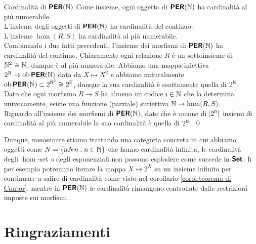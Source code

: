 \documentclass[openany]{book}
\begin{document}
\begin{proposition}{Cardinalità di $\text{\sffamily\textbf{PER}}(\mathbb{N})$}{}
    Come insieme, ogni oggetto di $\text{\sffamily\textbf{PER}}(\mathbb{N})$ ha cardinalità al più numerabile.\\
    L'insieme degli oggetti di $\text{\sffamily\textbf{PER}}(\mathbb{N})$ ha cardinalità del continuo.\\
    L'insieme $\hom(R,S)$ ha cardinalità al più numerabile.\\
    Combinando i due fatti precedenti, l'insieme dei morfismi di $\text{\sffamily\textbf{PER}}(\mathbb{N})$ ha cardinalità del continuo.
    \proof 
    Chiaramente ogni relazione $R$ è un sottoinsieme di $\mathbb{N}^2\cong \mathbb{N}$, dunque è al più numerabile.
    Abbiamo una mappa iniettiva $2^{\mathbb{N}} \to \operatorname{ob}\text{\sffamily\textbf{PER}}(\mathbb{N})$ data da $X\mapsto X^2$ e abbiamo naturalmente $\operatorname{ob}\text{\sffamily\textbf{PER}}(\mathbb{N})\subset 2^{\mathbb{N}^2}\cong 2^{\mathbb{N}}$, dunque la sua cardinalità è esattamente quella di $2^{\mathbb{N}}$.\\
    Dato che ogni morfismo $R\to S$ ha almeno un codice $i \in \mathbb{N}$ che la determina univocamente, esiste una funzione (parziale) suriettiva $\mathbb{N} \to \hom(R,S)$.\\
    Riguardo all'insieme dei morfismi di $\text{\sffamily\textbf{PER}}(\mathbb{N})$, dato che è unione di $|2^{\mathbb{N}}|$ insiemi di cardinalità al più numerabile la sua cardinalità è quella di $2^{\mathbb{N}}$.
    \qed
\end{proposition}

Dunque, nonostante stiamo trattando una categoria concreta in cui abbiamo oggetti come $N = \{nNn : n \in \mathbb{N}\}$ che hanno cardinalità infinita, le cardinalità degli $\hom$-set o degli esponenziali non possono esplodere come succede in $\text{\sffamily\textbf{Set}}$: lì per esempio potremmo iterare la mappa $X\mapsto 2^X$ su un insieme infinito per continuare a salire di cardinalità come visto nel corollario \cref{corol:teorema di Cantor}, mentre in $\text{\sffamily\textbf{PER}}(\mathbb{N})$ le cardinalità rimangono controllate dalle restrizioni imposte sui morfismi.

\nocite{*}
\printbibliography

\markboth{}{}

\section*{Ringraziamenti}
\end{document}

